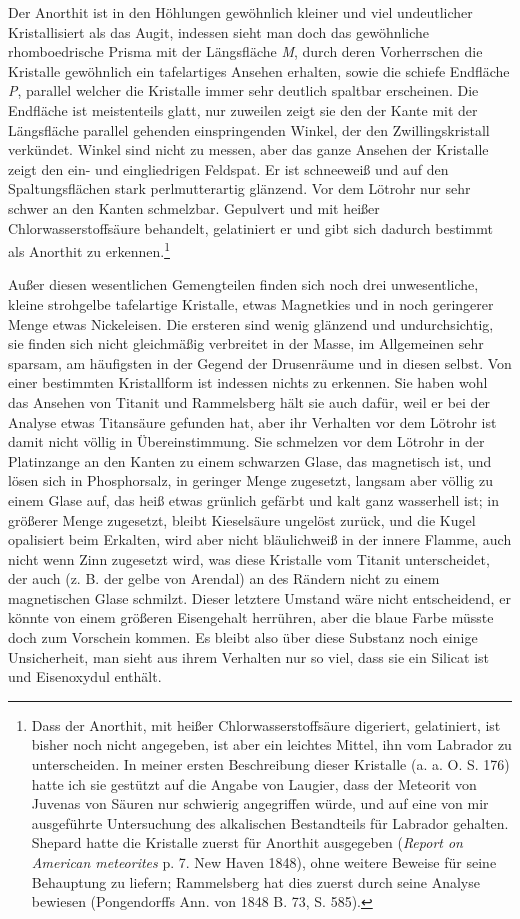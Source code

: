 \documentclass[a4paper, 11pt, oneside]{article}
\begin{document}
Der Anorthit ist in den Höhlungen gewöhnlich kleiner und viel undeutlicher Kristallisiert als das Augit, indessen sieht man doch das gewöhnliche rhomboedrische Prisma mit der Längsfläche \emph{M}, durch deren Vorherrschen die Kristalle gewöhnlich ein tafelartiges Ansehen erhalten, sowie die schiefe Endfläche \emph{P}, parallel welcher die Kristalle immer sehr deutlich spaltbar erscheinen. Die Endfläche ist meistenteils glatt, nur zuweilen zeigt sie den der Kante mit der Längsfläche parallel gehenden einspringenden Winkel, der den Zwillingskristall verkündet. Winkel sind nicht zu messen, aber das ganze Ansehen der Kristalle zeigt den ein- und eingliedrigen Feldspat. Er ist schneeweiß und auf den Spaltungsflächen stark perlmutterartig glänzend. Vor dem Lötrohr nur sehr schwer an den Kanten schmelzbar. Gepulvert und mit heißer Chlorwasserstoffsäure behandelt, gelatiniert er und gibt sich dadurch bestimmt als Anorthit zu erkennen.\footnote{Dass der Anorthit, mit heißer Chlorwasserstoffsäure digeriert, gelatiniert, ist bisher noch nicht angegeben, ist aber ein leichtes Mittel, ihn vom Labrador zu unterscheiden. In meiner ersten Beschreibung dieser Kristalle (a. a. O. S. 176) hatte ich sie gestützt auf die Angabe von Laugier, dass der Meteorit von Juvenas von Säuren nur schwierig angegriffen würde, und auf eine von mir ausgeführte Untersuchung des alkalischen Bestandteils für Labrador gehalten. Shepard hatte die Kristalle zuerst für Anorthit ausgegeben (\emph{Report on American meteorites} p. 7. New Haven 1848), ohne weitere Beweise für seine Behauptung zu liefern; Rammelsberg hat dies zuerst durch seine Analyse bewiesen (Pongendorffs Ann. von 1848 B. 73, S. 585).}

Außer diesen wesentlichen Gemengteilen finden sich noch drei unwesentliche, kleine strohgelbe tafelartige Kristalle, etwas Magnetkies und in noch geringerer Menge etwas Nickeleisen. Die ersteren sind wenig glänzend und undurchsichtig, sie finden sich nicht gleichmäßig verbreitet in der Masse, im Allgemeinen sehr sparsam, am häufigsten in der Gegend der Drusenräume und in diesen selbst. Von einer bestimmten Kristallform ist indessen nichts zu erkennen. Sie haben wohl das Ansehen von Titanit und Rammelsberg hält sie auch dafür, weil er bei der Analyse etwas Titansäure gefunden hat, aber ihr Verhalten vor dem Lötrohr ist damit nicht völlig in Übereinstimmung. Sie schmelzen vor dem Lötrohr in der Platinzange an den Kanten zu einem schwarzen Glase, das magnetisch ist, und lösen sich in Phosphorsalz, in geringer Menge zugesetzt, langsam aber völlig zu einem Glase auf, das heiß etwas grünlich gefärbt und kalt ganz wasserhell ist; in größerer Menge zugesetzt, bleibt Kieselsäure ungelöst zurück, und die Kugel opalisiert beim Erkalten, wird aber nicht bläulichweiß in der innere Flamme, auch nicht wenn Zinn zugesetzt wird, was diese Kristalle vom Titanit unterscheidet, der auch (z. B. der gelbe von Arendal) an des Rändern nicht zu einem magnetischen Glase schmilzt. Dieser letztere Umstand wäre nicht entscheidend, er könnte von einem größeren Eisengehalt herrühren, aber die blaue Farbe müsste doch zum Vorschein kommen. Es bleibt also über diese Substanz noch einige Unsicherheit, man sieht aus ihrem Verhalten nur so viel, dass sie ein Silicat ist und Eisenoxydul enthält.
\end{document}
